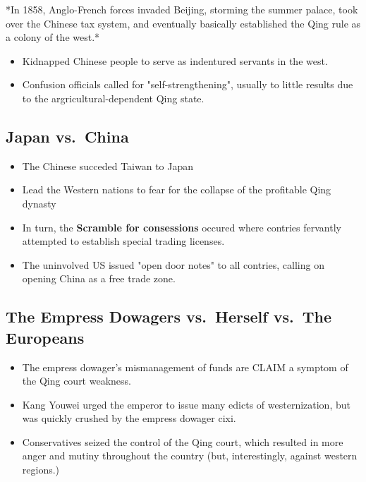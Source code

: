 \documentclass[letterpaper]{article}
\begin{document}
*In 1858, Anglo-French forces invaded Beijing, storming the summer
palace, took over the Chinese tax system, and eventually basically
established the Qing rule as a colony of the west.*

\begin{itemize}
\item Kidnapped Chinese people to serve as indentured servants in the west.
\item Confusion officials called for "self-strengthening", usually to little
results due to the argricultural-dependent Qing state.
\end{itemize}

\subsection{Japan vs. China}
\label{sec:orge9457c1}
\begin{itemize}
\item The Chinese succeded Taiwan to Japan
\item Lead the Western nations to fear for the collapse of the profitable
Qing dynasty
\item In turn, the \textbf{Scramble for consessions} occured where contries
fervantly attempted to establish special trading licenses.
\item The uninvolved US issued "open door notes" to all contries, calling on
opening China as a free trade zone.
\end{itemize}

\subsection{The Empress Dowagers vs. Herself vs. The Europeans}
\label{sec:org2126f2d}
\begin{itemize}
\item The empress dowager's mismanagement of funds are CLAIM a symptom of
the Qing court weakness.
\item Kang Youwei urged the emperor to issue many edicts of westernization,
but was quickly crushed by the empress dowager cixi.
\item Conservatives seized the control of the Qing court, which resulted in
more anger and mutiny throughout the country (but, interestingly,
against western regions.)
\end{itemize}
\end{document}
